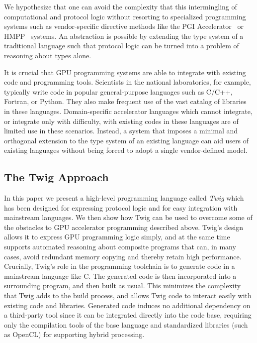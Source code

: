 We hypothesize that one can avoid the complexity that this intermingling of
computational and protocol logic without resorting to specialized programming
systems such as vendor-specific directive methods like the PGI
Accelerator~\cite{pgi-accelerate} or HMPP~\cite{hmpp} systems. An abstraction is
possible by extending the type system of a traditional language such that
protocol logic can be turned into a problem of reasoning about types alone.


It is crucial that GPU programming systems are able to integrate with existing
code and programming tools. Scientists in the national laboratories, for
example, typically write code in popular general-purpose languages such as
C/C++, Fortran, or Python. They also make frequent use of the vast catalog of
libraries in these languages. Domain-specific accelerator languages which cannot
integrate, or integrate only with difficulty, with existing codes in these
languages are of limited use in these scenarios. Instead, a system that imposes
a minimal and orthogonal extension to the type system of an existing language
can aid users of existing languages without being forced to adopt a single
vendor-defined model.

\subsection{The Twig Approach}

In this paper we present a high-level programming language called \emph{Twig}
which has been designed for expressing protocol logic and for easy integration
with mainstream languages. We then show how Twig can be used to overcome some of
the obstacles to GPU accelerator programming described above. Twig's design
allows it to express GPU programming logic simply, and at the same time supports
automated reasoning about composite programs that can, in many cases, avoid
redundant memory copying and thereby retain high performance. Crucially, Twig's
role in the programming toolchain is to generate code in a mainstream language
like C. The generated code is then incorporated into a surrounding program, and
then built as usual. This minimizes the complexity that Twig adds to the build
process, and allows Twig code to interact easily with existing code and
libraries. Generated code induces no additional dependency on a third-party tool
since it can be integrated directly into the code base, requiring only the
compilation tools of the base language and standardized libraries (such as
OpenCL) for supporting hybrid processing.

